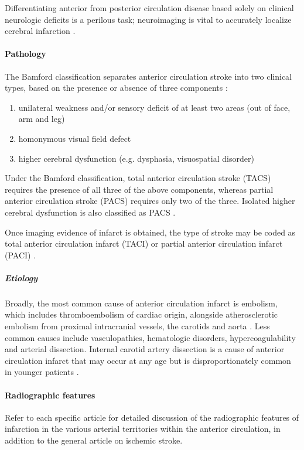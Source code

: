 Differentiating anterior from posterior circulation disease based solely on clinical neurologic deficits is a perilous task; neuroimaging is vital to accurately localize cerebral infarction .

\paragraph{Pathology}

The Bamford classification separates anterior circulation stroke into two clinical types, based on the presence or absence of three components :

\begin{enumerate}
	\item
	unilateral weakness and/or sensory deficit of at least two areas (out of face, arm and leg)
	\item
	homonymous visual field defect
	\item
	higher cerebral dysfunction (e.g. dysphasia, visuospatial disorder)
\end{enumerate}

Under the Bamford classification, total anterior circulation stroke (TACS) requires the presence of all three of the above components, whereas partial anterior circulation stroke (PACS) requires only two of the three. Isolated higher cerebral dysfunction is also classified as PACS .

Once imaging evidence of infarct is obtained, the type of stroke may be coded as total anterior circulation infarct (TACI) or partial anterior circulation infarct (PACI) .

\subparagraph{Etiology}

Broadly, the most common cause of anterior circulation infarct is embolism, which includes thromboembolism of cardiac origin, alongside atherosclerotic embolism from proximal intracranial vessels, the carotids and aorta . Less common causes include vasculopathies, hematologic disorders, hypercoagulability and arterial dissection. Internal carotid artery dissection is a cause of anterior circulation infarct that may occur at any age but is disproportionately common in younger patients .

\paragraph{Radiographic features}

Refer to each specific article for detailed discussion of the radiographic features of infarction in the various arterial territories within the anterior circulation, in addition to the general article on ischemic stroke.

